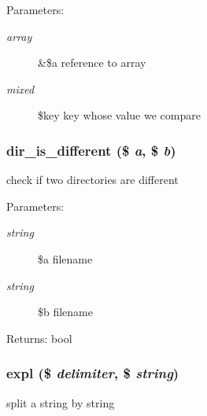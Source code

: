 \begin{Desc}
\item[Parameters:]
\begin{description}
\item[{\em array}]\&\$a reference to array \item[{\em mixed}]\$key key whose value we compare \end{description}
\end{Desc}
\hypertarget{util_8inc_8php_6309f576f2611237288d0dd3eed09db3}{
\subsubsection[{dir\_\-is\_\-different}]{\setlength{\rightskip}{0pt plus 5cm}dir\_\-is\_\-different (\$ {\em a}, \/  \$ {\em b})}}
\label{util_8inc_8php_6309f576f2611237288d0dd3eed09db3}


check if two directories are different

\begin{Desc}
\item[Parameters:]
\begin{description}
\item[{\em string}]\$a filename \item[{\em string}]\$b filename \end{description}
\end{Desc}
\begin{Desc}
\item[Returns:]bool \end{Desc}
\hypertarget{util_8inc_8php_afce787d4b725ac62be6306ff3e352e7}{
\subsubsection[{expl}]{\setlength{\rightskip}{0pt plus 5cm}expl (\$ {\em delimiter}, \/  \$ {\em string})}}
\label{util_8inc_8php_afce787d4b725ac62be6306ff3e352e7}


split a string by string

